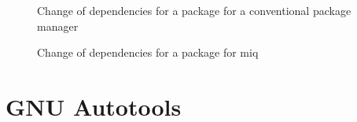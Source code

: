 \begin{figure}[hbtp]
    \centerfloat
    
    \caption{Change of dependencies for a package for a conventional package manager}
    \label{fig:depswap}
\end{figure}

\begin{figure}[hbtp]
    \centerfloat
    
    \caption{Change of dependencies for a package for miq}
    \label{fig:depswap_miq}
\end{figure}






\section{GNU Autotools}





